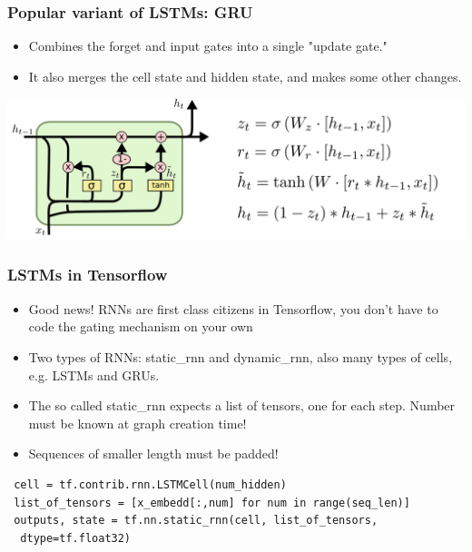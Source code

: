 \documentclass{beamer}
\begin{document}
\begin{frame}[fragile]
\frametitle{Popular variant of LSTMs: GRU}
  \begin{itemize}
  	\item Combines the forget and input gates into a single "update gate."
  	\item It also merges the cell state and hidden state, and makes some other changes. 
  \end{itemize}
\begin{center}
	\includegraphics[width=1.0\textwidth]{05_LSTM3-var-GRU}
\end{center}
\end{frame}

\begin{frame}[fragile]
 \frametitle{LSTMs in Tensorflow}
  \begin{itemize}
		\item Good news! RNNs are first class citizens in Tensorflow, you don't have to code the gating mechanism on your own
		\item Two types of RNNs: static\_rnn and dynamic\_rnn, also many types of cells, e.g. LSTMs and GRUs.
		\item The so called static\_rnn expects a list of tensors, one for each step. Number must be known at graph creation time!
		\item Sequences of smaller length must be padded!
	\end{itemize}
			
\begin{footnotesize}
\begin{lstlisting}
 cell = tf.contrib.rnn.LSTMCell(num_hidden)
 list_of_tensors = [x_embedd[:,num] for num in range(seq_len)]
 outputs, state = tf.nn.static_rnn(cell, list_of_tensors,
  dtype=tf.float32)
\end{lstlisting}   
\end{footnotesize}   
	
\end{frame}
\end{document}
